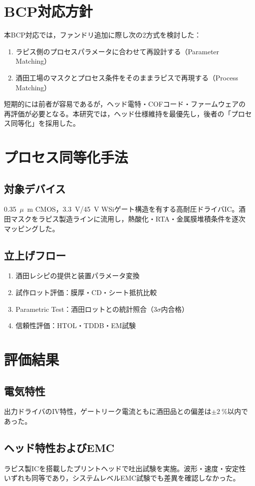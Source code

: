 \documentclass[conference]{IEEEtran}
\newcommand{\micro}{\ensuremath{\mu}}
\begin{document}
\section{BCP対応方針}
本BCP対応では，ファンドリ追加に際し次の2方式を検討した：
\begin{enumerate}
\item ラピス側のプロセスパラメータに合わせて再設計する（Parameter Matching）
\item 酒田工場のマスクとプロセス条件をそのままラピスで再現する（Process Matching）
\end{enumerate}
短期的には前者が容易であるが，ヘッド電特・COFコード・ファームウェアの再評価が必要となる。本研究では，ヘッド仕様維持を最優先し，後者の「プロセス同等化」を採用した。

\section{プロセス同等化手法}
\subsection{対象デバイス}
\SI{0.35}{\micro\meter} CMOS，\SI{3.3}{\volt}/\SI{45}{\volt} WSiゲート構造を有する高耐圧ドライバIC。酒田マスクをラピス製造ラインに流用し，熱酸化・RTA・金属膜堆積条件を逐次マッピングした。

\subsection{立上げフロー}
\begin{enumerate}
\item 酒田レシピの提供と装置パラメータ変換
\item 試作ロット評価：膜厚・CD・シート抵抗比較
\item Parametric Test：酒田ロットとの統計照合（$3\sigma$内合格）
\item 信頼性評価：HTOL・TDDB・EM試験
\end{enumerate}

\section{評価結果}
\subsection{電気特性}
出力ドライバのIV特性，ゲートリーク電流ともに酒田品との偏差は$\pm\SI{2}{\percent}$以内であった。

\subsection{ヘッド特性およびEMC}
ラピス製ICを搭載したプリントヘッドで吐出試験を実施。波形・速度・安定性いずれも同等であり，システムレベルEMC試験でも差異を確認しなかった。
\end{document}
